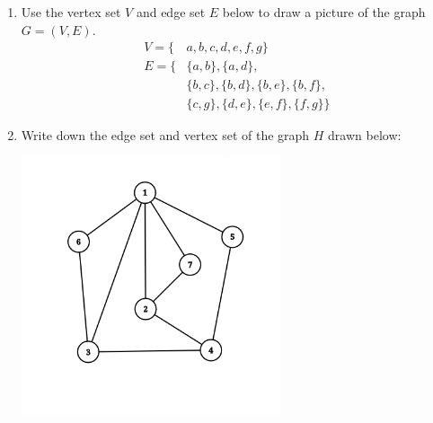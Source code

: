 \begin{enumerate}
    \item Use the vertex set $V$ and edge set $E$ below to draw a picture of the graph $G = (V, E)$.
    \begin{align*}
        V = \{&a, b, c, d, e, f, g\} \\
        E = \{& \{a, b\}, \{a, d\}, \\
              & \{b, c\}, \{b,d\}, \{b, e\}, \{b, f\}, \\
              & \{c, g\}, 
                \{d, e\}, 
                \{e, f\}, 
                \{f, g\}
            \}        
    \end{align*}

    \vfill

    \item Write down the edge set and vertex set of the graph $H$ drawn below:

    \includegraphics[width=0.6\textwidth]{G1-H-v1.png}
\end{enumerate}

